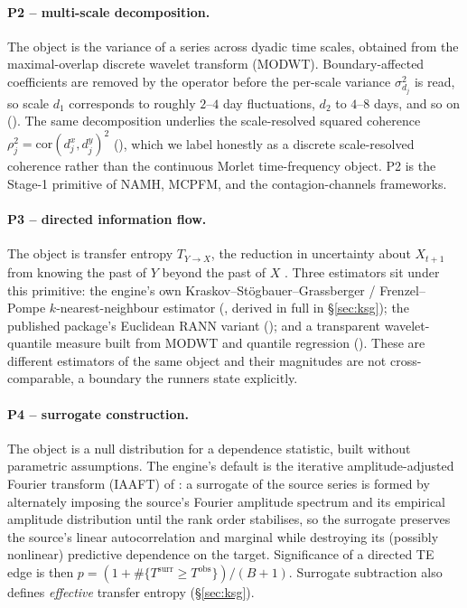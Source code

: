 \paragraph{P2 -- multi-scale decomposition.}
The object is the variance of a series across dyadic time scales, obtained from the
maximal-overlap discrete wavelet transform (MODWT). Boundary-affected coefficients
are removed by the  operator before the per-scale variance
$\sigma^2_{d_j}$ is read, so scale $d_1$ corresponds to roughly $2$--$4$ day
fluctuations, $d_2$ to $4$--$8$ days, and so on (). The same
decomposition underlies the scale-resolved squared coherence
$\rho^2_j=\mathrm{cor}(d^x_j,d^y_j)^2$ (), which we label
honestly as a discrete scale-resolved coherence rather than the continuous Morlet
time-frequency object. P2 is the Stage-1 primitive of NAMH, MCPFM, and the
contagion-channels frameworks.

\paragraph{P3 -- directed information flow.}
The object is transfer entropy $T_{Y\to X}$, the reduction in uncertainty about
$X_{t+1}$ from knowing the past of $Y$ beyond the past of $X$ \citep{schreiber2000}.
Three estimators sit under this primitive: the engine's own
Kraskov--St{\"o}gbauer--Grassberger / Frenzel--Pompe $k$-nearest-neighbour estimator
(, derived in full in \S\ref{sec:ksg}); the published 
package's Euclidean RANN variant (); and a transparent
wavelet-quantile measure built from MODWT and quantile regression ().
These are different estimators of the same object and their magnitudes are not
cross-comparable, a boundary the runners state explicitly.

\paragraph{P4 -- surrogate construction.}
The object is a null distribution for a dependence statistic, built without parametric
assumptions. The engine's default is the iterative amplitude-adjusted Fourier
transform (IAAFT) of \citet{schreiber1996}: a surrogate of the source series is formed
by alternately imposing the source's Fourier amplitude spectrum and its empirical
amplitude distribution until the rank order stabilises, so the surrogate preserves the
source's linear autocorrelation and marginal while destroying its (possibly nonlinear)
predictive dependence on the target. Significance of a directed TE edge is then
$p=(1+\#\{T^{\text{surr}}\ge T^{\text{obs}}\})/(B+1)$. Surrogate subtraction also
defines \emph{effective} transfer entropy (\S\ref{sec:ksg}).

